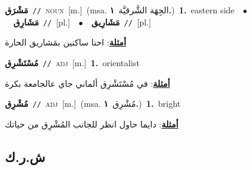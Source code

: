 \documentclass[10pt,a4paper,twoside]{article} %
\begin{document}
\begin{multicols}{2}
{\setlength\topsep{0pt}\textbf{\foreignlanguage{arabic}{مَشْرَق}}\ {\color{gray}\texttt{//}\color{black}}\ \textsc{noun}\ [m.]\ \color{gray}(msa. \foreignlanguage{arabic}{الجِهَة الشَّرقيَّة}~\foreignlanguage{arabic}{\textbf{١.}})\color{black}\ \textbf{1.}~eastern side\ \ $\bullet$\ \ \setlength\topsep{0pt}\textbf{\foreignlanguage{arabic}{مَشَارِق}}\ {\color{gray}\texttt{//}\color{black}}\ [pl.]\ \ $\bullet$\ \ \setlength\topsep{0pt}\textbf{\foreignlanguage{arabic}{مَشَارِيق}}\ {\color{gray}\texttt{//}\color{black}}\ [pl.]\  \begin{flushright}\color{gray}\foreignlanguage{arabic}{\textbf{\underline{\foreignlanguage{arabic}{أمثلة}}}: احنا ساكنين بمَشاريق الحارة}\end{flushright}\color{black}} \vspace{2mm}

{\setlength\topsep{0pt}\textbf{\foreignlanguage{arabic}{مُسْتَشْرِق}}\ {\color{gray}\texttt{//}\color{black}}\ \textsc{adj}\ [m.]\ \textbf{1.}~orientalist\  \begin{flushright}\color{gray}\foreignlanguage{arabic}{\textbf{\underline{\foreignlanguage{arabic}{أمثلة}}}: في مُسْتَشْرِق ألماني جاي عالجامعة بكرة}\end{flushright}\color{black}} \vspace{2mm}

{\setlength\topsep{0pt}\textbf{\foreignlanguage{arabic}{مُشْرِق}}\ {\color{gray}\texttt{//}\color{black}}\ \textsc{adj}\ [m.]\ \color{gray}(msa. \foreignlanguage{arabic}{مُشْرِق}~\foreignlanguage{arabic}{\textbf{١.}})\color{black}\ \textbf{1.}~bright\  \begin{flushright}\color{gray}\foreignlanguage{arabic}{\textbf{\underline{\foreignlanguage{arabic}{أمثلة}}}: دايما حاول انظر للجانب المُشْرِق من حياتك}\end{flushright}\color{black}} \vspace{2mm}

\vspace{-3mm}
\subsection*{\color{blue}\foreignlanguage{arabic}{ش.ر.ك}\color{blue}{}} 


\end{multicols}
\end{document}
